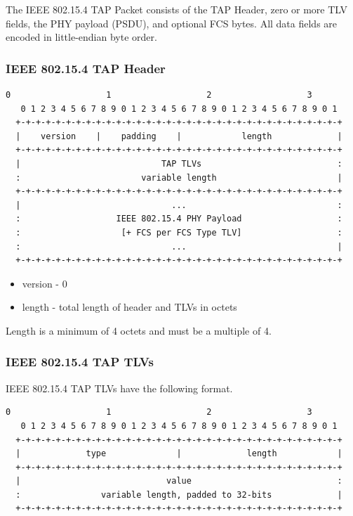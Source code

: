 \documentclass[12pt]{article}
\renewcommand\_{\textunderscore\allowbreak}
\begin{document}
The IEEE 802.15.4 TAP Packet consists of the TAP Header, zero or more TLV
fields, the PHY payload (PSDU), and optional FCS bytes.  All data fields are
encoded in little-endian byte order.

\subsubsection{IEEE 802.15.4 TAP Header}

\begin{Verbatim}[samepage=true]
   0                   1                   2                   3
   0 1 2 3 4 5 6 7 8 9 0 1 2 3 4 5 6 7 8 9 0 1 2 3 4 5 6 7 8 9 0 1
  +-+-+-+-+-+-+-+-+-+-+-+-+-+-+-+-+-+-+-+-+-+-+-+-+-+-+-+-+-+-+-+-+
  |    version    |    padding    |            length             |
  +-+-+-+-+-+-+-+-+-+-+-+-+-+-+-+-+-+-+-+-+-+-+-+-+-+-+-+-+-+-+-+-+
  |                            TAP TLVs                           :
  :                        variable length                        |
  +-+-+-+-+-+-+-+-+-+-+-+-+-+-+-+-+-+-+-+-+-+-+-+-+-+-+-+-+-+-+-+-+
  |                              ...                              :
  :                   IEEE 802.15.4 PHY Payload                   :
  :                    [+ FCS per FCS Type TLV]                   :
  :                              ...                              |
  +-+-+-+-+-+-+-+-+-+-+-+-+-+-+-+-+-+-+-+-+-+-+-+-+-+-+-+-+-+-+-+-+
\end{Verbatim}

\begin{itemize}
    \item version - 0
    \item length - total length of header and TLVs in octets
\end{itemize}
Length is a minimum of 4 octets and must be a multiple of 4.

\newpage
\subsubsection{IEEE 802.15.4 TAP TLVs}

IEEE 802.15.4 TAP TLVs have the following format.

\begin{Verbatim}[samepage=true]
   0                   1                   2                   3
   0 1 2 3 4 5 6 7 8 9 0 1 2 3 4 5 6 7 8 9 0 1 2 3 4 5 6 7 8 9 0 1
  +-+-+-+-+-+-+-+-+-+-+-+-+-+-+-+-+-+-+-+-+-+-+-+-+-+-+-+-+-+-+-+-+
  |             type              |             length            |
  +-+-+-+-+-+-+-+-+-+-+-+-+-+-+-+-+-+-+-+-+-+-+-+-+-+-+-+-+-+-+-+-+
  |                             value                             :
  :                variable length, padded to 32-bits             |
  +-+-+-+-+-+-+-+-+-+-+-+-+-+-+-+-+-+-+-+-+-+-+-+-+-+-+-+-+-+-+-+-+
\end{Verbatim}
\end{document}
